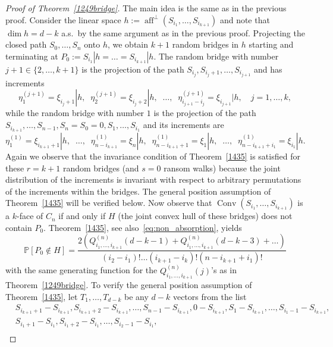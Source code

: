 \documentclass[12pt, reqno]{amsart}
\theoremstyle{plain}
\theoremstyle{definition}
\theoremstyle{remark}
\begin{document}
\begin{proof}[Proof of Theorem~\ref{1249bridge}]
The main idea is the same as in the previous proof. Consider the linear space $h:={\mathop{\mathrm{aff}}\nolimits}^\perp(S_{i_1},\ldots,S_{i_{k+1}})$ and note that $\dim h = d-k$ a.s.\ by the same argument as in the previous proof. Projecting the closed path $S_0,\ldots,S_n$ onto $h$, we obtain $k+1$ random bridges in $h$ starting and terminating at $P_0:=S_{i_1}|h = \ldots= S_{i_{k+1}}|h$. The random bridge with number $j+1\in \{2,\ldots,k+1\}$ is the projection of the path $S_{i_j}, S_{i_j+1},\ldots, S_{i_{j+1}}$ and has increments
$$
\eta_1^{(j+1)}=\xi_{i_j+1}|h, \;\;  \eta_2^{(j+1)}=\xi_{i_j+2}|h, \;\;  \ldots, \;\; \eta_{i_{j+1} - i_j}^{(j+1)}=\xi_{i_{j+1}}|h, \quad j=1,\ldots,k,
$$
while the random bridge with number $1$ is the projection of the path $S_{i_{k+1}},\ldots, S_{n-1}, S_n=S_0=0, S_1,\ldots, S_{i_1}$ and its increments are
$$
\eta_1^{(1)}=\xi_{i_{k+1}+1} | h, \;\; \ldots, \;\; \eta_{n-i_{k+1}}^{(1)}=\xi_{n}|h,\;\;
\eta_{n-i_{k+1} + 1}^{(1)}=\xi_{1} | h, \;\; \ldots, \;\; \eta_{n-i_{k+1} + i_1}^{(1)}=\xi_{i_1}|h.
$$
Again we observe that the invariance condition of Theorem~\ref{1435} is satisfied for these $r=k+1$ random bridges (and $s=0$ ransom walks) because the joint distribution of the increments is invariant with respect to arbitrary permutations of the increments within the bridges. The general position assumption of Theorem~\ref{1435} will be verified below. Now observe that ${\mathop{\mathrm{Conv}}\nolimits}(S_{i_1},\ldots,S_{i_{k+1}})$ is a $k$-face of $C_n$  if and only if $H$ (the joint convex hull of these bridges) does not contain $P_0$.  Theorem~\ref{1435}, see also~\eqref{eq:non_absorption},  yields
$$
{\mathbb{P}}[P_0\notin H]=
\frac{
2(Q_{i_1,\ldots,i_{k+1}}^{(n)}(d-k-1) + Q_{i_1,\ldots,i_{k+1}}^{(n)}(d-k-3)+\ldots)
}{(i_2-i_1)!\ldots  (i_{k+1}-i_k)! (n-i_{k+1}+i_1)!}
$$
with the same generating function for the $Q_{i_1,\ldots,i_{k+1}}^{(n)}(j)$'s as in Theorem~\ref{1249bridge}.
To verify the general position assumption of Theorem~\ref{1435},  let $T_1,\ldots,T_{d-k}$ be any $d-k$ vectors from the list
\begin{align*}
&S_{i_{k+1}+1} - S_{i_{k+1}}, S_{i_{k+1}+2} - S_{i_{k+1}}, \ldots, S_{n-1}- S_{i_{k+1}},
 0 - S_{i_{k+1}}, S_1-S_{i_{k+1}},\ldots,S_{i_1-1}-S_{i_{k+1}},  \\%
&S_{i_1+1} - S_{i_1}, S_{i_1+2} - S_{i_1}, \ldots,S_{i_2-1} - S_{i_1}, \\

\end{align*}
\end{proof}
\end{document}
